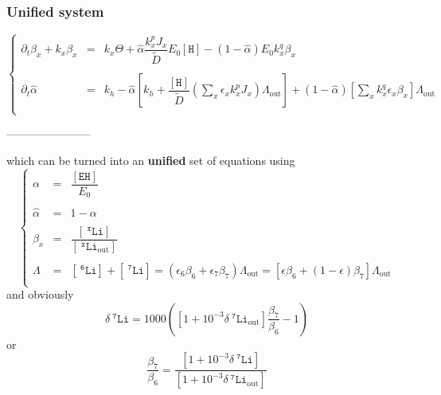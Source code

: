 \documentclass[aps,onecolumn,12pt]{revtex4}
\newcommand{\mychem}[1]{\mathtt{#1}}
\newcommand{\myconc}[1]{\left\lbrack{#1}\right\rbrack}
\newcommand{\spLi}[1]{{~^{\mychem{#1}}\mychem{Li}}}
\newcommand{\Li}[1]{\myconc{\spLi{#1}}}
\newcommand{\spLiOut}[1]{{\spLi{#1}}_{\mathrm{out}}}
\newcommand{\LiOut}[1]{\myconc{\spLiOut{#1}}}
\newcommand{\spEHin}{\mychem{EH}}
\newcommand{\EHin}{\myconc{\spEHin}}
\newcommand{\spproton}{\mychem{H}}
\newcommand{\proton}{\myconc{\spproton}}
\newcommand{\deltaLi}{ {\delta\!\!\!\spLi{7}} }
\newcommand{\deltaLiOut}{{\deltaLi}_{\mathrm{out}}}
\newcommand{\LiAll}{\Lambda}
\newcommand{\LiAllOut}{{\LiAll}_{\mathrm{out}}}
\begin{document}
\subsubsection{Unified system}
\begin{equation}
\left\lbrace
\begin{array}{rcl}
\partial_t \beta_x + k_x \beta_x & = &  k_x \Theta  +  \hat\alpha \dfrac{ k_x^p J_x}{\tilde{D}} E_0 \proton  -  \left(1-\hat\alpha\right) E_0 k_x^q \beta_x \\
\\
	\partial_t \hat\alpha & = & k_h - \hat\alpha \left\lbrack k_h+ \dfrac{\proton}{\tilde{D}} \left(\sum_x \epsilon_x k_x^p J_x \right) \LiAllOut \right] 
		+ (1-\hat\alpha) \left\lbrack {\sum_x k_x^q \epsilon_x \beta_x }  \right\rbrack \LiAllOut \\
\end{array}
\right.
\end{equation}


\centerline{-----------------------}

which can be turned into an \textbf{unified} set of equations using
\begin{equation}
\left\lbrace
\begin{array}{rcl}
	\alpha & = & \dfrac{\EHin}{E_0}\\
	\\
	\hat\alpha & = & 1-\alpha\\
	\\
	\beta_x & = & \dfrac{\Li{x}}{\LiOut{x}}\\
	\\
	\Lambda & = & \Li{6} + \Li{7} = \left(\epsilon_6 \beta_6 + \epsilon_7 \beta_7\right) \LiAllOut = \left[\epsilon \beta_6 + (1-\epsilon) \beta_7\right] \LiAllOut\\
\end{array}
\right.
\end{equation}
and obviously
\begin{equation}
	\deltaLi = 1000 \left ( \left[1+10^{-3}\deltaLiOut\right] \dfrac{\beta_7}{\beta_6}-1\right)
\end{equation}
or
\begin{equation}
	\dfrac{ \beta_7}{\beta_6} = \dfrac{\left[1+10^{-3}\deltaLi\right]}{\left[1+10^{-3}\deltaLiOut\right]}
\end{equation}
\end{document}
